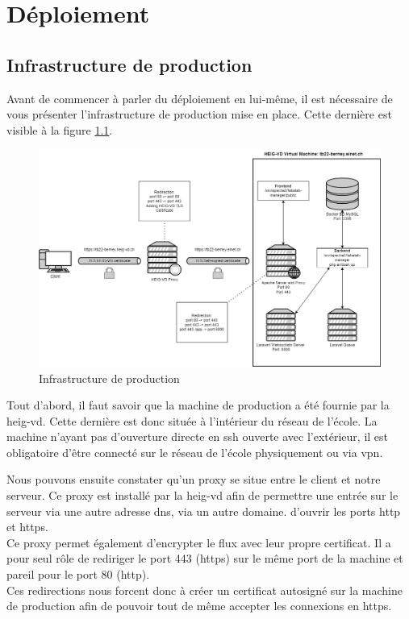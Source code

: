 \documentclass[
    iai, %
    il, %
]{heig-tb}
\begin{document}
\chapter{Déploiement}

\section{Infrastructure de production}
Avant de commencer à parler du déploiement en lui-même, il est nécessaire de vous présenter l'infrastructure de production mise en place. Cette dernière est visible à la figure \ref{prod-infra}.

\begin{center}
    \begin{figure}[H]
        \includegraphics[width=\textwidth]{./assets/figures/prod-infra.png}
        \caption{Infrastructure de production \label{prod-infra}}
    \end{figure}
\end{center}

Tout d'abord, il faut savoir que la machine de production a été fournie par la \Gls{heig-vd}. Cette dernière est donc située à l'intérieur du réseau de l'école. La machine n'ayant pas d'ouverture directe en \Gls{ssh} ouverte avec l'extérieur, il est obligatoire d'être connecté sur le réseau de l'école physiquement ou via \Gls{vpn}.

Nous pouvons ensuite constater qu'un \Gls{proxy} se situe entre le client et notre serveur. Ce \Gls{proxy} est installé par la \Gls{heig-vd} afin de permettre une entrée sur le serveur via une autre adresse \Gls{dns}, via un autre domaine. d'ouvrir les ports \Gls{http} et \Gls{https}. \\
Ce \Gls{proxy} permet également d'encrypter le flux avec leur propre certificat. Il a pour seul rôle de rediriger le port 443 (\Gls{https}) sur le même port de la machine et pareil pour le port 80 (\Gls{http}). \\
Ces redirections nous forcent donc à créer un certificat autosigné sur la machine de production afin de pouvoir tout de même accepter les connexions en \Gls{https}.
\end{document}
